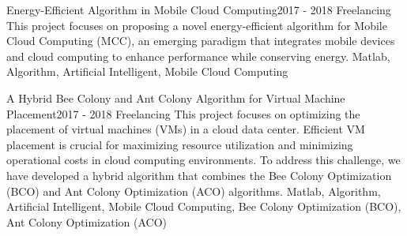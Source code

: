 \begin{projects}
	\project
	{Energy-Efficient Algorithm in Mobile Cloud Computing}{2017 - 2018}
	{ {Freelancing} }
	{This project focuses on proposing a novel energy-efficient algorithm for Mobile Cloud Computing (MCC), an emerging paradigm that integrates mobile devices and cloud computing to enhance performance while conserving energy.}
	{Matlab, Algorithm, Artificial Intelligent, Mobile Cloud Computing}

	
	\project
	{A Hybrid Bee Colony and Ant Colony Algorithm for Virtual Machine Placement}{2017 - 2018}
	{ {Freelancing} }
	{This project focuses on optimizing the placement of virtual machines (VMs) in a cloud data center. Efficient VM placement is crucial for maximizing resource utilization and minimizing operational costs in cloud computing environments. To address this challenge, we have developed a hybrid algorithm that combines the Bee Colony Optimization (BCO) and Ant Colony Optimization (ACO) algorithms.}
	{Matlab, Algorithm, Artificial Intelligent, Mobile Cloud Computing, Bee Colony Optimization (BCO), Ant Colony Optimization (ACO)}



\end{projects}